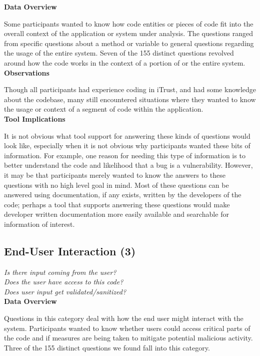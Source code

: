 \documentclass[conference]{IEEEtran}
\begin{document}
\noindent\textbf{Data Overview}

Some participants wanted to know how code entities or pieces of code fit into the overall context of the application or system under analysis. 
The questions ranged from specific questions about a method or variable to general questions regarding the usage of the entire system. 
Seven of the 155 distinct questions revolved around how the code works in the context of a portion of or the entire system.
\\

\noindent\textbf{Observations}

Though all participants had experience coding in iTrust, and had some knowledge about the codebase, many still encountered situations where they wanted to know the usage or context of a segment of code within the application. 
\\

\noindent\textbf{Tool Implications}

It is not obvious what tool support for answering these kinds of questions would look like, especially when it is not obvious why participants wanted these bits of information. 
For example, one reason for needing this type of information is to better understand the code and likelihood that a bug is a vulnerability. 
However, it may be that participants merely wanted to know the answers to these questions with no high level goal in mind.
Most of these questions can be answered using documentation, if any exists, written by the developers of the code; perhaps a tool that supports answering these questions would make developer written documentation more easily available and searchable for information of interest.



\noindent\subsection{\textbf{End-User Interaction (3)}}
\label{eui}

\noindent\emph{Is there input coming from the user?} \\
\emph{Does the user have access to this code?} \\
\emph{Does user input get validated/sanitized?} \\


\noindent\textbf{Data Overview}

Questions in this category deal with how the end user might interact with the system. 
Participants wanted to know whether users could access critical parts of the code and if measures are being taken to mitigate potential malicious activity. 
Three of the 155 distinct questions we found fall into this category.
\\
\end{document}
